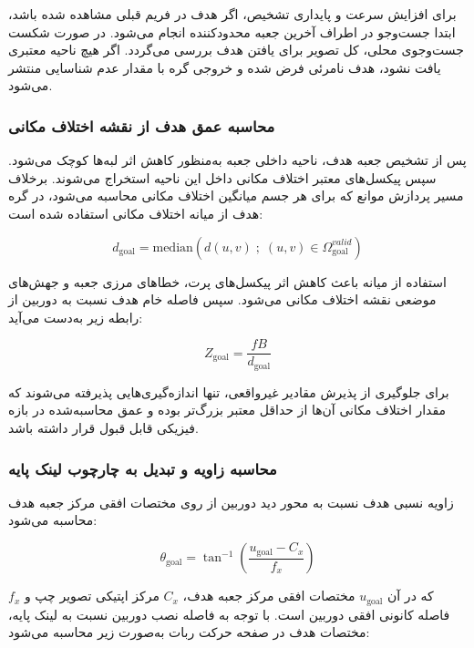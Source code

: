 برای افزایش سرعت و پایداری تشخیص، اگر هدف در فریم قبلی مشاهده شده باشد، ابتدا جست‌وجو در اطراف آخرین جعبه محدودکننده انجام می‌شود. در صورت شکست جست‌وجوی محلی، کل تصویر برای یافتن هدف بررسی می‌گردد. اگر هیچ ناحیه معتبری یافت نشود، هدف نامرئی فرض شده و خروجی گره با مقدار عدم شناسایی منتشر می‌شود.

\subsubsection{محاسبه عمق هدف از نقشه اختلاف مکانی}

پس از تشخیص جعبه هدف، ناحیه داخلی جعبه به‌منظور کاهش اثر لبه‌ها کوچک می‌شود. سپس پیکسل‌های معتبر اختلاف مکانی داخل این ناحیه استخراج می‌شوند. برخلاف مسیر پردازش موانع که برای هر جسم میانگین اختلاف مکانی محاسبه می‌شود، در گره هدف از میانه اختلاف مکانی استفاده شده است:

\begin{equation}
	d_{\mathrm{goal}} =
	\mathrm{median}
	\left(
	d(u,v) \; ; \; (u,v)\in\Omega_{\mathrm{goal}}^{valid}
	\right)
	\label{eq:goal_median_disparity}
\end{equation}

استفاده از میانه باعث کاهش اثر پیکسل‌های پرت، خطاهای مرزی جعبه و جهش‌های موضعی نقشه اختلاف مکانی می‌شود. سپس فاصله خام هدف نسبت به دوربین از رابطه زیر به‌دست می‌آید:

\begin{equation}
	Z_{\mathrm{goal}} =
	\frac{fB}{d_{\mathrm{goal}}}
	\label{eq:goal_raw_depth}
\end{equation}

برای جلوگیری از پذیرش مقادیر غیرواقعی، تنها اندازه‌گیری‌هایی پذیرفته می‌شوند که مقدار اختلاف مکانی آن‌ها از حداقل معتبر بزرگ‌تر بوده و عمق محاسبه‌شده در بازه فیزیکی قابل قبول قرار داشته باشد.

\subsubsection{محاسبه زاویه و تبدیل به چارچوب لینک پایه}

زاویه نسبی هدف نسبت به محور دید دوربین از روی مختصات افقی مرکز جعبه هدف محاسبه می‌شود:

\begin{equation}
	\theta_{\mathrm{goal}} =
	\tan^{-1}
	\left(
	\frac{u_{\mathrm{goal}}-C_x}{f_x}
	\right)
	\label{eq:goal_camera_bearing}
\end{equation}

که در آن \(u_{\mathrm{goal}}\) مختصات افقی مرکز جعبه هدف، \(C_x\) مرکز اپتیکی تصویر چپ و \(f_x\) فاصله کانونی افقی دوربین است. با توجه به فاصله نصب دوربین نسبت به لینک پایه، مختصات هدف در صفحه حرکت ربات به‌صورت زیر محاسبه می‌شود:

